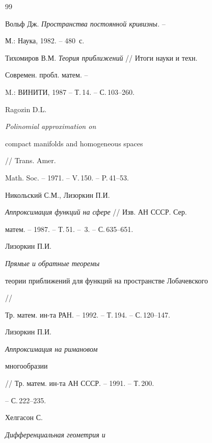 \begin{thebibliography}{99}







Вольф Дж. {\it Пространства постоянной кривизны.} --


М.: Наука, 1982. -- 480~с.







Тихомиров В.М. {\it Теория приближений} // Итоги науки и техн.


Современ. пробл. матем. --


M.: ВИНИТИ, 1987 -- Т.\,14. -- С.\,103--260.







Ragozin D.L. {\it Polinomial approximation on


compact manifolds and homogeneous spaces} // Trans. Amer.


Math. Soc. -- 1971. -- V.\,150. -- P.\,41--53.







Никольский С.М., Лизоркин П.И.


{\it Аппроксимация функций на сфере} // Изв. АН СССР. Сер.


матем. -- 1987. -- Т.\,51. -- \No\,3. -- С.\,635--651.







Лизоркин П.И. {\it Прямые и обратные теоремы


теории приближений для функций на пространстве Лобачевского} //


Тр. матем. ин-та РАН. -- 1992. -- Т.\,194. -- С.\,120--147.







Лизоркин П.И. {\it Аппроксимация на римановом


многообразии} // Тр. матем. ин-та АН СССР. -- 1991. -- Т.\,200.


-- С.\,222--235.







Хелгасон С. {\it Дифференциальная геометрия и


}
\end{thebibliography}
